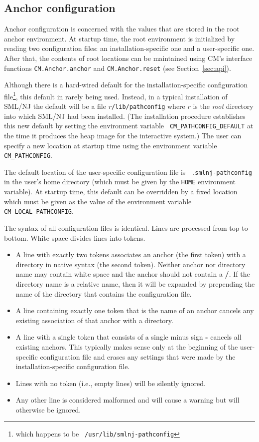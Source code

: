\documentclass[titlepage,letterpaper]{article}
\begin{document}
\subsection{Anchor configuration}
\label{sec:anchor:config}

Anchor configuration is concerned with the values that are stored in
the root anchor environment.  At startup time, the root environment is
initialized by reading two configuration files: an
installation-specific one and a user-specific one.  After that, the
contents of root locations can be maintained using CM's interface
functions {\tt CM.Anchor.anchor} and {\tt CM.Anchor.reset} (see
Section~\ref{sec:api}).

Although there is a hard-wired default for the installation-specific
configuration file\footnote{which happens to be {\tt
/usr/lib/smlnj-pathconfig}}, this default in rarely being used.
Instead, in a typical installation of SML/NJ the default will be a
file $r${\tt /lib/pathconfig} where $r$ is the {\it root} directory
into which SML/NJ had been installed.  (The installation procedure
establishes this new default by setting the environment variable {\tt
CM\_PATHCONFIG\_DEFAULT} at the time it produces the heap image for
the interactive system.)  The user can specify a new location at
startup time using the environment variable {\tt CM\_PATHCONFIG}.

The default location of the user-specific configuration file is {\tt
.smlnj-pathconfig} in the user's home directory (which must be given
by the {\tt HOME} environment variable).  At startup time, this
default can be overridden by a fixed location which must be given as
the value of the environment variable {\tt CM\_LOCAL\_PATHCONFIG}.

The syntax of all configuration files is identical.  Lines are
processed from top to bottom. White space divides lines into tokens.
\begin{itemize}
\item A line with exactly two tokens associates an anchor (the first
token) with a directory in native syntax (the second token).  Neither
anchor nor directory name may contain white space and the anchor
should not contain a {\bf /}.  If the directory name is a relative
name, then it will be expanded by prepending the name of the directory
that contains the configuration file.
\item A line containing exactly one token that is the name of an
anchor cancels any existing association of that anchor with a
directory.
\item A line with a single token that consists of a single minus sign
{\bf -} cancels all existing anchors.  This typically makes sense only
at the beginning of the user-specific configuration file and
erases any settings that were made by the installation-specific
configuration file.
\item Lines with no token (i.e., empty lines) will be silently ignored.
\item Any other line is considered malformed and will cause a warning
but will otherwise be ignored.
\end{itemize}
\end{document}
